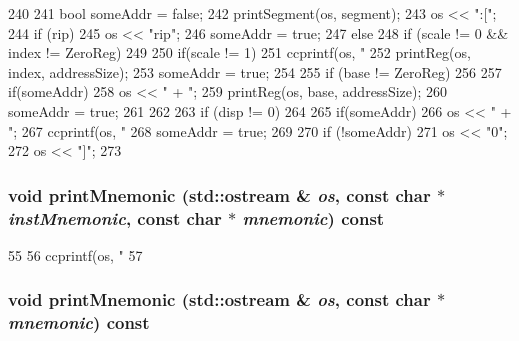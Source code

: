 \begin{DoxyCode}
240     {
241         bool someAddr = false;
242         printSegment(os, segment);
243         os << ":[";
244         if (rip) {
245             os << "rip";
246             someAddr = true;
247         } else {
248             if (scale != 0 && index != ZeroReg)
249             {
250                 if(scale != 1)
251                     ccprintf(os, "%
252                 printReg(os, index, addressSize);
253                 someAddr = true;
254             }
255             if (base != ZeroReg)
256             {
257                 if(someAddr)
258                     os << " + ";
259                 printReg(os, base, addressSize);
260                 someAddr = true;
261             }
262         }
263         if (disp != 0)
264         {
265             if(someAddr)
266                 os << " + ";
267             ccprintf(os, "%
268             someAddr = true;
269         }
270         if (!someAddr)
271             os << "0";
272         os << "]";
273     }
\end{DoxyCode}
\hypertarget{classX86ISA_1_1X86StaticInst_a4166e37250db584e4d5053f23c9900c3}{
\subsubsection[{printMnemonic}]{\setlength{\rightskip}{0pt plus 5cm}void printMnemonic (std::ostream \& {\em os}, \/  const char $\ast$ {\em instMnemonic}, \/  const char $\ast$ {\em mnemonic}) const}}
\label{classX86ISA_1_1X86StaticInst_a4166e37250db584e4d5053f23c9900c3}



\begin{DoxyCode}
55     {
56         ccprintf(os, "  %
57     }
\end{DoxyCode}
\hypertarget{classX86ISA_1_1X86StaticInst_a298e3bb3bf0f69614fcddceb66eda6a1}{
\subsubsection[{printMnemonic}]{\setlength{\rightskip}{0pt plus 5cm}void printMnemonic (std::ostream \& {\em os}, \/  const char $\ast$ {\em mnemonic}) const}}
\label{classX86ISA_1_1X86StaticInst_a298e3bb3bf0f69614fcddceb66eda6a1}



